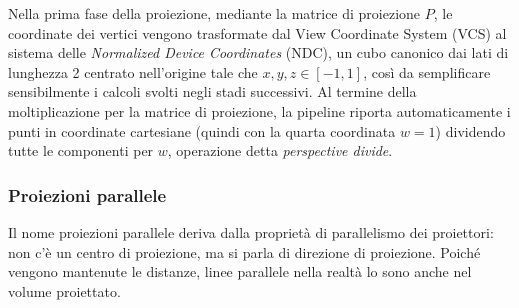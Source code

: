 Nella prima fase della proiezione, mediante la matrice di proiezione $P$, le coordinate dei vertici vengono trasformate dal View Coordinate System (VCS) al sistema delle \emph{Normalized Device Coordinates} (NDC), un cubo canonico dai lati di lunghezza 2 centrato nell'origine tale che $x, y, z \in [-1, 1]$, così da semplificare sensibilmente i calcoli svolti negli stadi successivi.
Al termine della moltiplicazione per la matrice di proiezione, la  pipeline riporta automaticamente i punti in coordinate cartesiane (quindi con la quarta coordinata $w = 1$)  dividendo tutte le componenti per $w$, operazione detta \emph{perspective divide}.

\subsubsection{Proiezioni parallele}
Il nome proiezioni parallele deriva dalla proprietà di parallelismo dei proiettori: non c'è un centro di proiezione, ma si parla di direzione di proiezione.
Poiché vengono mantenute le distanze, linee parallele nella realtà lo sono anche nel volume proiettato.

